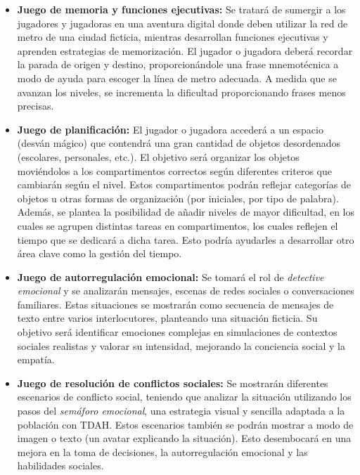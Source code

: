 \begin{itemize}
    \item \textbf{Juego de memoria y funciones ejecutivas:} Se tratará de sumergir a los jugadores y jugadoras en una aventura digital donde deben utilizar la red de metro de una ciudad ficticia, mientras desarrollan funciones ejecutivas y aprenden estrategias de memorización.
    El jugador o jugadora deberá recordar la parada de origen y destino, proporcionándole una frase mnemotécnica a modo de ayuda para escoger la línea de metro adecuada.
    A medida que se avanzan los niveles, se incrementa la dificultad proporcionando frases menos precisas.
    \item \textbf{Juego de planificación:} El jugador o jugadora accederá a un espacio (desván mágico) que contendrá una gran cantidad de objetos desordenados (escolares, personales, etc.). 
    El objetivo será organizar los objetos moviéndolos a los compartimentos correctos según diferentes criteros que cambiarán según el nivel. 
    Estos compartimentos podrán reflejar categorías de objetos u otras formas de organización (por iniciales, por tipo de palabra). 
    Además, se plantea la posibilidad de añadir niveles de mayor dificultad, en los cuales se agrupen distintas tareas en compartimentos, los cuales reflejen el tiempo que se dedicará a dicha tarea. 
    Esto podría ayudarles a desarrollar otro área clave como la gestión del tiempo.
    \item \textbf{Juego de autorregulación emocional:} Se tomará el rol de \textit{detective emocional} y se analizarán mensajes, escenas de redes sociales o conversaciones familiares. 
    Estas situaciones se mostrarán como secuencia de mensajes de texto entre varios interlocutores, planteando una situación ficticia.
    Su objetivo será identificar emociones complejas en simulaciones de contextos sociales realistas y valorar su intensidad, mejorando la conciencia social y la empatía.
    \item \textbf{Juego de resolución de conflictos sociales:} Se mostrarán diferentes escenarios de conflicto social, teniendo que analizar la situación utilizando los pasos del \textit{semáforo emocional}, una estrategia visual y sencilla adaptada a la población con TDAH. 
    Estos escenarios también se podrán mostrar a modo de imagen o texto (un avatar explicando la situación).
    Esto desembocará en una mejora en la toma de decisiones, la autorregulación emocional y las habilidades sociales.
\end{itemize}

